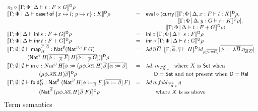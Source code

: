 \documentclass{lmcs}
\theoremstyle{plain}\newtheorem{satz}[thm]{Satz}
\newcommand{\inl}{\mathsf{inl}}
\newcommand{\inr}{\mathsf{inr}}
\newcommand{\fold}{\mathsf{fold}}
\newcommand{\set}{\mathsf{Set}}
\renewcommand{\id}{\mathit{id}}
\newcommand{\map}{\mathsf{map}}
\begin{document}
\begin{figure*}
{\begin{minipage}[t]{0.5\textwidth}
\[\begin{array}{lll}
\pi_2 \circ \dsem{\Gamma;\Phi \,|\, \Delta \vdash t : F \times
  G} \rho\\
\dsem{\Gamma;\Phi~|~\Delta \vdash \cse{t}{x \mapsto l}{y \mapsto r} :
  K}\rho & = & \eval \circ \langle \curry \,[\dsem{\Gamma;\Phi
    \,|\, \Delta, x : F \vdash l : K}\rho,\\
   & & \hspace*{0.79in} \dsem{\Gamma;\Phi \,|\, \Delta, y
    : G \vdash r : K}\rho],\\
   & &  \hspace*{0.5in} \dsem{\Gamma;\Phi \,|\, \Delta \vdash t :
  F + G} \rho\rangle\\   
\dsem{\Gamma;\Phi \,|\, \Delta \vdash \inl \,s: F + G} \rho& = &
\inl \circ \dsem{\Gamma;\Phi \,|\, \Delta \vdash s: F}\rho\\
\dsem{\Gamma;\Phi \,|\, \Delta \vdash \inr \,t: F + G}\rho & = & 
\inr \circ \dsem{\Gamma;\Phi \,|\, \Delta \vdash t : G}\rho\\
\llbracket \Gamma;\emptyset \,|\, \emptyset \vdash \map^{\ol{F},\ol{G}}_H
  : \Nat^\emptyset (\Nat^{\ol\beta,\ol\gamma} F\,G)
& = & \lambda d\, \ol\eta\,\ol{C}.\,
\dsem{\Gamma; \ol{\phi},\ol{\gamma}\vdash H}\id_{\rho[\ol{\gamma:=
      C}]}[\ol{\phi := \lambda \ol B. \eta_{\ol B\, \ol C}}]\\ 
\hspace*{0.5in}
  (\Nat^{\ol{\gamma}}\,H[\ol{\phi :=_{\ol{\beta}} F}]\,H[\ol{\phi
      :=_{\ol{\beta}} G}]) \rrbracket^{\mathsf D} \rho & &\\
\llbracket \Gamma;\emptyset \,|\, \emptyset \vdash \tin_H :
Nat^{\ol{\beta}} \, H[\phi := (\mu \phi.\lambda {\overline
    \alpha}.H){\overline \beta}][\ol{\alpha := \beta}] & = &
\lambda
d.\,\mathit{in}_{{T}^X_{H,\rho}} \;\;\mbox{ where } X \mbox{ is } \set \mbox{ when } \\ 
\hspace*{0.79in}(\mu \phi.\lambda {\overline \alpha}.H){\overline
  \beta} \rrbracket^{\mathsf{D}} \rho & & \hspace*{0.2in}  
\mathsf{D} = \set \mbox{ and not present when }
\mathsf{D} = \rel\\  
\llbracket \Gamma;\emptyset \,|\, \emptyset \vdash
  \fold^F_H : \Nat^\emptyset\;(\Nat^{\ol{\beta}}\,H[\phi
    :=_{\ol{\beta}} F][\ol{\alpha := \beta}]\,F) & = &  
\lambda d\,\eta. \,\mathit{fold}_{T^X_{H,\rho}} \, \eta\\ 
\hspace*{0.79in}(\Nat^{{\ol{\beta}} }\,(\mu
  \phi.\lambda \overline \alpha.H)\overline \beta\;F)
\rrbracket^{\mathsf{D}} \rho & & \hspace*{0.2in} \mbox{ where } X \mbox{ is as above
}\vspace*{-0.1in} 
\end{array}\]
\caption{Term semantics}\label{fig:term-sem} 
\end{minipage}}\vspace*{-0.05in}
\end{figure*}
\end{document}
